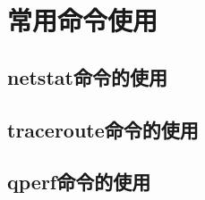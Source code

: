 \chapter{常用命令使用}
\label{sec:BasicCommand}







































\section{netstat命令的使用}
\label{sec:netstatCmd}



\section{traceroute命令的使用}
\label{sec:tracerouteCmd}







\section{qperf命令的使用}
\label{sec:qperfCmd}

